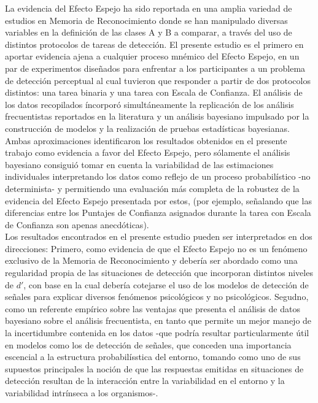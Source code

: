 \documentclass[jou,apacite]{apa6}
\begin{document}
La evidencia del Efecto Espejo ha sido reportada en una amplia variedad de estudios en Memoria de Reconocimiento donde se han manipulado diversas variables en la definición de las clases A y B a comparar, a través del uso de distintos protocolos de tareas de detección. El presente estudio es el primero en aportar evidencia ajena a cualquier proceso mnémico del Efecto Espejo, en un par de experimentos diseñados para enfrentar a los participantes a un problema de detección perceptual al cual tuvieron que responder a partir de dos protocolos distintos: una tarea binaria y una tarea con Escala de Confianza. El análisis de los datos recopilados íncorporó simultáneamente la replicación de los análisis frecuentistas reportados en la literatura y un análisis bayesiano impulsado por la construcción de modelos y la realización de pruebas estadísticas bayesianas. Ambas aproximaciones identificaron los resultados obtenidos en el presente trabajo como evidencia a favor del Efecto Espejo, pero sólamente el análisis bayesiano  consiguió tomar en cuenta la variabilidad de las estimaciones individuales interpretando los datos como reflejo de un proceso probabilístico -no determinista- y permitiendo una evaluación más completa de la robustez de la evidencia del Efecto Espejo presentada por estos, (por ejemplo, señalando que las diferencias entre los Puntajes de Confianza asignados durante la tarea con Escala de Confianza son apenas anecdóticas).\\

Los resultados encontrados en el presente estudio pueden ser interpretados en dos direcciones: Primero, como evidencia de que el Efecto Espejo no es un fenómeno exclusivo de la Memoria de Reconocimiento y debería ser abordado como una regularidad propia de las situaciones de detección que incorporan distintos niveles de $d'$, con base en la cual debería cotejarse el uso de los modelos de detección de señales para explicar diversos fenómenos psicológicos y no psicológicos. Segudno, como un referente empírico sobre las ventajas que presenta el análisis de datos bayesiano sobre el análisis frecuentista, en tanto que permite un mejor manejo de la incertidumbre contenida en los datos -que podría resultar particularmente útil en modelos como los de detección de señales, que conceden una importancia escencial a la estructura probabilísstica del entorno, tomando como uno de sus supuestos principales la noción de que las respuestas emitidas en situaciones de detección resultan de la interacción entre la variabilidad en el entorno y la variabilidad intrínseca a los organismos-.\\
\end{document}
